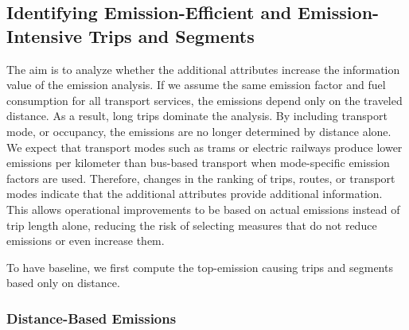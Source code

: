 \subsection{Identifying Emission-Efficient and Emission-Intensive Trips and Segments}
The aim is to analyze whether the additional attributes increase the information value of the emission analysis. If we assume the same emission factor and fuel consumption for all transport services, the emissions depend only on the traveled distance. As a result, long trips dominate the analysis. By including transport mode, or occupancy, the emissions are no longer determined by distance alone. We expect that transport modes such as trams or electric railways produce lower emissions per kilometer than bus-based transport when mode-specific emission factors are used. Therefore, changes in the ranking of trips, routes, or transport modes indicate that the additional attributes provide additional information. This allows operational improvements to be based on actual emissions instead of trip length alone, reducing the risk of selecting measures that do not reduce emissions or even increase them.

To have baseline, we first compute the top-emission causing trips and segments based only on distance.


\subsubsection{Distance-Based Emissions}


